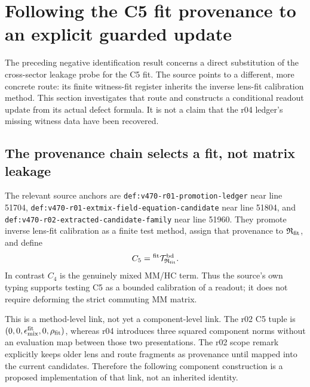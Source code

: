\documentclass[11pt,a4paper]{article}
\begin{document}
\section{Following the C5 fit provenance to an explicit guarded update}
\label{sec:c5-bifocal-update-investigation}
The preceding negative identification result concerns a direct substitution
of the cross-sector leakage probe for the C5 fit. The source points to a
different, more concrete route: its finite witness-fit register inherits
the inverse lens-fit calibration method. This section investigates that
route and constructs a conditional readout update from its actual defect
formula. It is not a claim that the r04 ledger's missing witness data have
been recovered.

\subsection{The provenance chain selects a fit, not matrix leakage}
The relevant source anchors are
\texttt{def:v470-r01-promotion-ledger} near line 51704,
\texttt{def:v470-r01-extmix-field-equation-candidate} near line 51804,
and \texttt{def:v470-r02-extracted-candidate-family} near line 51960.
They promote inverse lens-fit calibration as a finite test method, assign
that provenance to $\mathfrak R_{\rm fit}$, and define
\[
 C_5={}^{\rm fit}\mathcal T_{\mathfrak R_{\rm fit}}^{\rm bd}.
\]
In contrast $C_4$ is the genuinely mixed MM/HC term. Thus the source's
own typing supports testing C5 as a bounded calibration of a readout;
it does not require deforming the strict commuting MM matrix.

This is a method-level link, not yet a component-level link. The r02 C5
tuple is $(0,0,\epsilon_{\rm mix}^{\rm fit},0,\rho_{\rm fit})$, whereas
r04 introduces three squared component norms without an evaluation map
between those two presentations. The r02 scope remark explicitly keeps
older lens and route fragments as provenance until mapped into the
current candidates. Therefore the following component construction is
a proposed implementation of that link, not an inherited identity.
\end{document}
